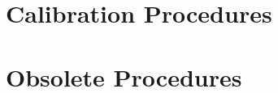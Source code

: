 \documentclass[]{report}
\newcommand{\shwlabel}[1]{\label{#1}}
\newcommand{\newprocedure}[5]{     %
\shwlabel{#1}
\markright{Intro: #2 Rev.#5}
~\\
\begin{tabular}{|l|l|}
\hline
Written/Revised By  &  #3 \\
\hline
Date        &  #4 \\
\hline
Revision     &  #5 \\
\hline
\end{tabular}
~\\
\vspace*{0.25in}
}
\begin{document}

\renewcommand{\newprocedure}[5]{
\shwlabel{#1}
\markright{CalProc: #2 Rev.#5}
~\\
\begin{tabular}{|l|l|}
\hline
Written/Revised By  &  #3 \\
\hline
Date        &  #4 \\
\hline
Revision     &  #5 \\
\hline
\end{tabular}
~\\
\vspace*{0.25in}
}



\chapter{Calibration Procedures}
\shwlabel{ChapterProcedures}
  
  
  
  
  
  
  
  
  
  
  





  

 

  
  

  
\appendix
 





\chapter{Obsolete Procedures}


  
  
  
  
  
  



 
\end{document}
